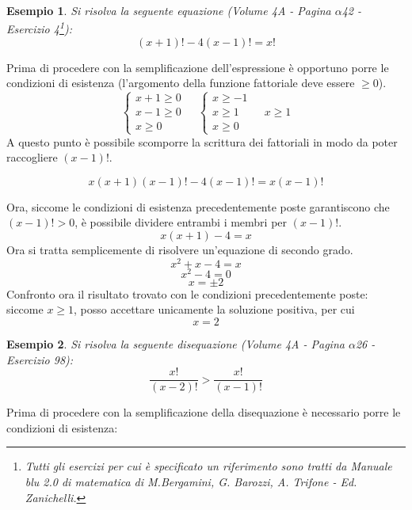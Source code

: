\documentclass{article}     %
\newtheorem{ex}{Esempio}[section]
\begin{document}
            \begin{ex}
                Si risolva la seguente equazione (Volume 4A - Pagina $\alpha$42 - Esercizio 4\footnote{Tutti gli esercizi per cui è specificato un riferimento sono tratti da \textit{Manuale blu 2.0 di matematica} di M.Bergamini, G. Barozzi, A. Trifone - Ed. Zanichelli.}):
            \[(x+1)!-4(x-1)!=x!\]
            \end{ex}
            Prima di procedere con la semplificazione dell'espressione è opportuno porre le condizioni di esistenza (l'argomento della funzione fattoriale deve essere $\geq 0$).
            \[ \left\{
            \begin{array}{c}
                 x+1\geq 0 \\
                 x-1\geq 0 \\
                 x\geq 0
            \end{array} \right. ~~~~~
            \left\{
            \begin{array}{c}
                 x\geq -1 \\
                 x\geq 1 \\
                 x\geq 0
            \end{array} \right. ~~~~~
            x\geq 1
            \]
            A questo punto è possibile scomporre la scrittura dei fattoriali in modo da poter raccogliere $(x-1)!$.
            
            \[x(x+1)(x-1)!-4(x-1)!=x(x-1)!\]
            
            Ora, siccome le condizioni di esistenza precedentemente poste garantiscono che $(x-1)!>0$, è possibile dividere entrambi i membri per $(x-1)!$.
            \[x(x+1)-4=x\]
            Ora si tratta semplicemente di risolvere un'equazione di secondo grado.
            \[x^2+x-4=x\]
            \[x^2-4=0\]
            \[x=\pm2\]
            Confronto ora il risultato trovato con le condizioni precedentemente poste: siccome $x\geq1$, posso accettare unicamente la soluzione positiva, per cui \[x=2\]
        
            \begin{ex}
                Si risolva la seguente disequazione (Volume 4A - Pagina $\alpha$26 - Esercizio 98):
                \[\frac{x!}{(x-2)!}>\frac{x!}{(x-1)!}\]
            \end{ex}
            
            Prima di procedere con la semplificazione della disequazione è necessario porre le condizioni di esistenza:
\end{document}
